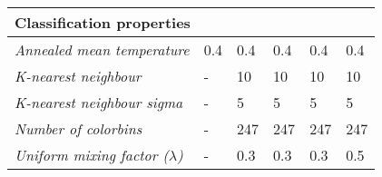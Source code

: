 \begin{table}[h]
\begin{tabular}{|l|l|l|l|l|l|}
		\multicolumn{6}{|l|}{\textbf{Classification properties}} \\ \hline  
		\textit{Annealed mean temperature} & 0.4                                                                   &0.4                                                                   &0.4                                                                   &0.4                                                                                          &0.4                                                                                \\ \hline
		\textit{K-nearest neighbour}       & -                                                                 & 10                                                                & 10                                                                & 10                                                                                       & 10                                                                             \\ \hline
		\textit{K-nearest neighbour sigma} & -                                                                 & 5                                                                 & 5                                                                 & 5                                                                                        & 5                                                                              \\ \hline
		\textit{Number of colorbins} & -                                                                 & 247                                                                 & 247                                                                 & 247                                                                                        & 247                                                                              \\ \hline
		\textit{Uniform mixing factor ($\lambda$)} & -                                                                 & 0.3                                                                 & 0.3                                                                 & 0.3                                                                                        & 0.5                                                                              \\ \hline
	\end{tabular}
\end{table}

